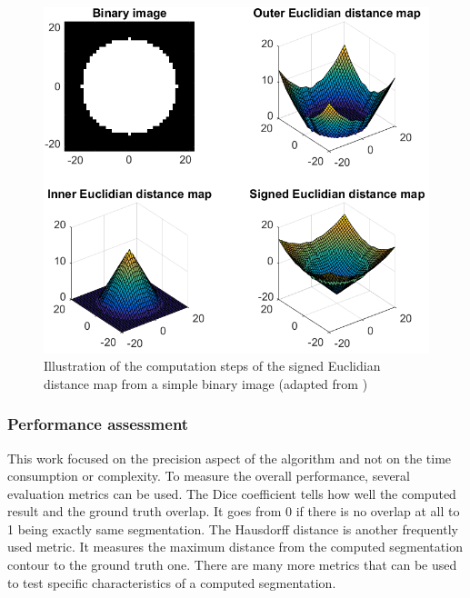 \begin{figure}[h!]
	\centering
	\includegraphics[width=0.8\linewidth]{img/distMap}
	\caption{Illustration of the computation steps of the signed Euclidian distance map from a simple binary image (adapted from \cite{Rohlfing2007})}
	\label{fig:distMap}
\end{figure}

\subsubsection*{Performance assessment}
This work focused on the precision aspect of the algorithm and not on the time consumption or complexity. To measure the overall performance, several evaluation metrics can be used. The Dice coefficient tells how well the computed result and the ground truth overlap. It goes from 0 if there is no overlap at all to 1 being exactly same segmentation. The Hausdorff distance is another frequently used metric. It measures the maximum distance from the computed segmentation contour to the ground truth one. There are many more metrics that can be used to test specific characteristics of a computed segmentation. 
